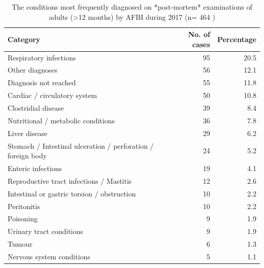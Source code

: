 \documentclass[]{book}
\begin{document}
\begin{table}

\caption{\label{tab:unnamed-chunk-16}The conditions most frequently diagnosed on *post-mortem* examinations of adults (>12 months) by AFBI during 2017 (n= 464 )}
\centering
\begin{tabular}[t]{l|r|r}
\hline
Category & No. of cases & Percentage\\
\hline
Respiratory infections & 95 & 20.5\\
\hline
Other diagnoses & 56 & 12.1\\
\hline
Diagnosis not reached & 55 & 11.8\\
\hline
Cardiac / circulatory system & 50 & 10.8\\
\hline
Clostridial disease & 39 & 8.4\\
\hline
Nutritional / metabolic conditions & 36 & 7.8\\
\hline
Liver disease & 29 & 6.2\\
\hline
Stomach / Intestinal ulceration / perforation / foreign body & 24 & 5.2\\
\hline
Enteric infections & 19 & 4.1\\
\hline
Reproductive tract infections / Mastitis & 12 & 2.6\\
\hline
Intestinal or gastric torsion / obstruction & 10 & 2.2\\
\hline
Peritonitis & 10 & 2.2\\
\hline
Poisoning & 9 & 1.9\\
\hline
Urinary tract conditions & 9 & 1.9\\
\hline
Tumour & 6 & 1.3\\
\hline
Nervous system conditions & 5 & 1.1\\
\hline
\end{tabular}
\end{table}
\end{document}
